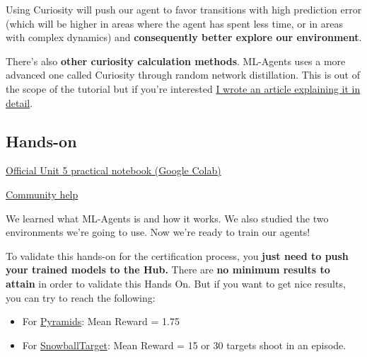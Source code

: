 \documentclass[11pt,a4paper]{article}
\begin{document}

Using Curiosity will push our agent to favor transitions with high prediction error (which will be higher in areas where the agent has spent less time, or in areas with complex dynamics) and \textbf{consequently better explore our environment}.

There's also \textbf{other curiosity calculation methods}. ML-Agents uses a more advanced one called Curiosity through random network distillation. This is out of the scope of the tutorial but if you're interested \href{https://medium.com/data-from-the-trenches/curiosity-driven-learning-through-random-network-distillation-488ffd8e5938}{I wrote an article explaining it in detail}.

\subsection{Hands-on}\label{hands-on}

\href{https://colab.research.google.com/github/huggingface/deep-rl-class/blob/main/notebooks/unit5/unit5.ipynb}{Official Unit 5 practical notebook (Google Colab)}

\href{http://hf.co/join/discord}{Community help}

We learned what ML-Agents is and how it works. We also studied the two environments we're going to use. Now we're ready to train our agents!


To validate this hands-on for the certification process, you \textbf{just need to push your trained models to the Hub.} There are \textbf{no minimum results to attain} in order to validate this Hands On. But if you want to get nice results, you can try to reach the following:

\begin{itemize}
\tightlist
\item
  For \href{https://huggingface.co/spaces/unity/ML-Agents-Pyramids}{Pyramids}: Mean Reward = 1.75
\item
  For \href{https://huggingface.co/spaces/ThomasSimonini/ML-Agents-SnowballTarget}{SnowballTarget}: Mean Reward = 15 or 30 targets shoot in an episode.
\end{itemize}
\end{document}
